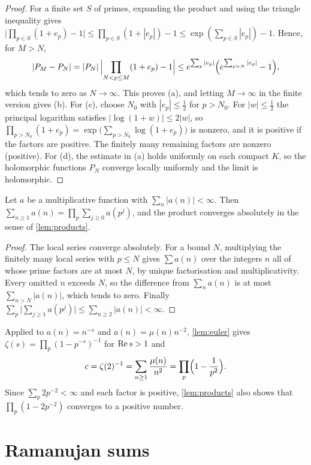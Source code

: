 \begin{proof}
For a finite set $S$ of primes, expanding the product and using the triangle inequality gives $\bigl|\prod_{p\in S}(1+e_p)-1\bigr|\le\prod_{p\in S}(1+|e_p|)-1\le\exp(\sum_{p\in S}|e_p|)-1$. Hence, for $M>N$,
\[
|P_M-P_N|=|P_N|\,\Bigl|\prod_{N<p\le M}(1+e_p)-1\Bigr|\le e^{\sum_p|e_p|}\Bigl(e^{\sum_{p>N}|e_p|}-1\Bigr),
\]
which tends to zero as $N\to\infty$. This proves (a), and letting $M\to\infty$ in the finite version gives (b). For (c), choose $N_0$ with $|e_p|\le\frac12$ for $p>N_0$. For $|w|\le\frac12$ the principal logarithm satisfies $|\log(1+w)|\le2|w|$, so $\prod_{p>N_0}(1+e_p)=\exp\bigl(\sum_{p>N_0}\log(1+e_p)\bigr)$ is nonzero, and it is positive if the factors are positive. The finitely many remaining factors are nonzero (positive). For (d), the estimate in (a) holds uniformly on each compact $K$, so the holomorphic functions $P_N$ converge locally uniformly and the limit is holomorphic.
\end{proof}

\begin{lemma}\label{lem:euler}
Let $a$ be a multiplicative function with $\sum_n|a(n)|<\infty$. Then $\sum_{n\ge1}a(n)=\prod_p\sum_{j\ge0}a(p^j)$, and the product converges absolutely in the sense of \cref{lem:products}.
\end{lemma}

\begin{proof}
The local series converge absolutely. For a bound $N$, multiplying the finitely many local series with $p\le N$ gives $\sum a(n)$ over the integers $n$ all of whose prime factors are at most $N$, by unique factorisation and multiplicativity. Every omitted $n$ exceeds $N$, so the difference from $\sum_na(n)$ is at most $\sum_{n>N}|a(n)|$, which tends to zero. Finally $\sum_p\bigl|\sum_{j\ge1}a(p^j)\bigr|\le\sum_{n\ge2}|a(n)|<\infty$.
\end{proof}

Applied to $a(n)=n^{-s}$ and $a(n)=\mu(n)n^{-2}$, \cref{lem:euler} gives $\zeta(s)=\prod_p(1-p^{-s})^{-1}$ for $\operatorname{Re} s>1$ and
\begin{equation}\label{eq:c-euler}
c=\zeta(2)^{-1}=\sum_{n\ge1}\frac{\mu(n)}{n^2}=\prod_p\Bigl(1-\frac1{p^2}\Bigr).
\end{equation}
Since $\sum_p2p^{-2}<\infty$ and each factor is positive, \cref{lem:products} also shows that $\prod_p(1-2p^{-2})$ converges to a positive number.

\section{Ramanujan sums}

